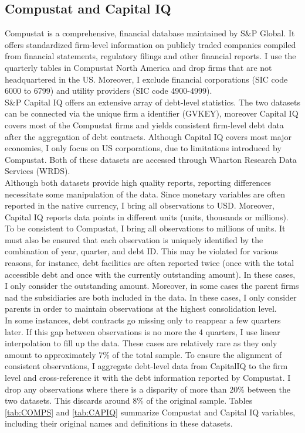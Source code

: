 \documentclass[12pt]{article}
\begin{document}
\subsection{Compustat and Capital IQ}
Compustat is a comprehensive, financial database maintained by S\&P Global. It offers standardized firm-level information on publicly traded companies compiled from financial statements, regulatory filings and other financial reports. I use the quarterly tables in Compustat North America and drop firms that are not headquartered in the US. Moreover, I exclude financial corporations (SIC code 6000 to 6799) and utility providers (SIC code 4900-4999). \vspace{3mm} \\
S\&P Capital IQ offers an extensive array of debt-level statistics. The two datasets can be connected via the unique firm a identifier (GVKEY), moreover Capital IQ covers most of the Compustat firms and yields consistent firm-level debt data after the aggregation of debt contracts. Although Capital IQ covers most major economies, I only focus on US corporations, due to limitations introduced by Compustat. Both of these datasets are accessed through Wharton Research Data Services (WRDS). \vspace{3mm} \\
Although both datasets provide high quality reports, reporting differences necessitate some manipulation of the data. Since monetary variables are often reported in the native currency, I bring all observations to USD. Moreover, Capital IQ reports data points in different units (units, thousands or millions). To be consistent to Compustat, I bring all observations to millions of units. It must also be ensured that each observation is uniquely identified by the combination of year, quarter, and debt ID. This may be violated for various reasons, for instance, debt facilities are often reported twice (once with the total accessible debt and once with the currently outstanding amount). In these cases, I only consider the outstanding amount. Moreover, in some cases the parent firms nad the subsidiaries are both included in the data. In these cases, I only consider parents in order to maintain observations at the highest consolidation level. \vspace{3mm} \\
In some instances, debt contracts go missing only to reappear a few quarters later. If this gap between observations is no more the 4 quarters, I use linear interpolation to fill up the data. These cases are relatively rare as they only amount to approximately 7\% of the total sample. To ensure the alignment of consistent observations, I aggregate debt-level data from CapitalIQ to the firm level and cross-reference it with the debt information reported by Compustat. I drop any observations where there is a disparity of more than 20\% between the two datasets. This discards around 8\% of the original sample. Tables \ref{tab:COMPS} and \ref{tab:CAPIQ} summarize Compustat and Capital IQ variables, including their original names and definitions in these datasets. \vspace{3mm} \\
\end{document}
